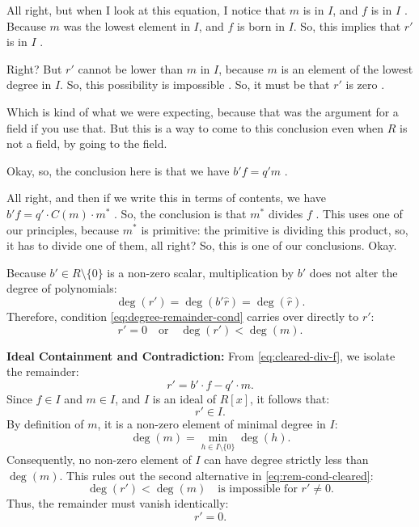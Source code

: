 \begin{proofWrapper}
\begin{speech}[00:25:59 - 00:28:09]
All right, but when I look at this equation, I notice that $m$ is in $I$, and $f$ is in $I$ . Because $m$ was the lowest element in $I$, and $f$ is born in $I$. So, this implies that $r'$ is in $I$ .

Right? But $r'$ cannot be lower than $m$ in $I$, because $m$ is an element of the lowest degree in $I$. So, this possibility is impossible . So, it must be that $r'$ is zero .

Which is kind of what we were expecting, because that was the argument for a field if you use that. But this is a way to come to this conclusion even when $R$ is not a field, by going to the field.

Okay, so, the conclusion here is that we have $b' f = q' m$ .

All right, and then if we write this in terms of contents, we have $b' f = q' \cdot C(m) \cdot m^*$ . So, the conclusion is that $m^*$ divides $f$ . This uses one of our principles, because $m^*$ is primitive: the primitive is dividing this product, so, it has to divide one of them, all right? So, this is one of our conclusions. Okay.
\end{speech}

\begin{content}
Because $b' \in R \setminus \{0\}$ is a non-zero scalar, multiplication by $b'$ does not alter the degree of polynomials:
\[
\deg(r') = \deg(b' \hat{r}) = \deg(\hat{r}).
\]
Therefore, condition \eqref{eq:degree-remainder-cond} carries over directly to $r'$:
\begin{equation}\label{eq:rem-cond-cleared}
r' = 0 \quad \text{or} \quad \deg(r') < \deg(m).
\end{equation}

\textbf{Ideal Containment and Contradiction:}
From \eqref{eq:cleared-div-f}, we isolate the remainder:
\[
r' = b' \cdot f - q' \cdot m.
\]
Since $f \in I$ and $m \in I$, and $I$ is an ideal of $R[x]$, it follows that:
\[
r' \in I.
\]
By definition of $m$, it is a non-zero element of minimal degree in $I$:
\[
\deg(m) = \min_{h \in I \setminus \{0\}} \deg(h).
\]
Consequently, no non-zero element of $I$ can have degree strictly less than $\deg(m)$. This rules out the second alternative in \eqref{eq:rem-cond-cleared}:
\[
\deg(r') < \deg(m) \quad \text{is impossible for } r' \neq 0.
\]
Thus, the remainder must vanish identically:
\begin{equation}\label{eq:rprime-zero}
r' = 0.
\end{equation}


\end{content}
\end{proofWrapper}
